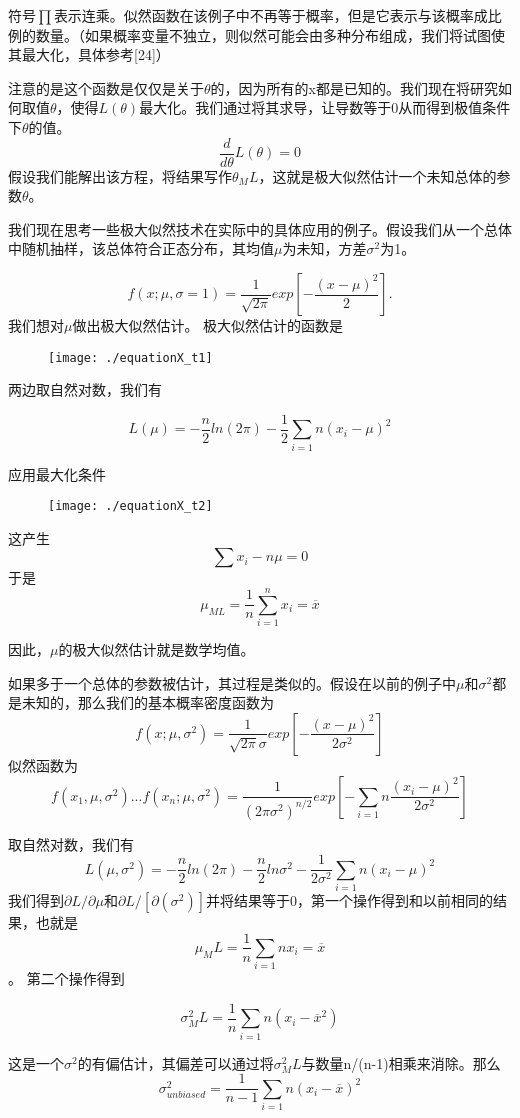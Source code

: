 \documentclass[cn,11pt,chinese]{elegantbook}
\begin{document}
{符号$\prod$表示连乘。似然函数在该例子中不再等于概率，但是它表示与该概率成比例的数量。（如果概率变量不独立，则似然可能会由多种分布组成，我们将试图使其最大化，具体参考[24]）

注意的是这个函数是仅仅是关于$\theta$的，因为所有的x都是已知的。我们现在将研究如何取值$\theta$，使得$L(\theta)$最大化。我们通过将其求导，让导数等于0从而得到极值条件下$\theta$的值。
$$\frac{d}{d\theta}L(\theta) =0$$
假设我们能解出该方程，将结果写作$\theta_ML$，这就是极大似然估计一个未知总体的参数$\theta$。

我们现在思考一些极大似然技术在实际中的具体应用的例子。假设我们从一个总体中随机抽样，该总体符合正态分布，其均值$\mu$为未知，方差$\sigma^2$为1。

$$f(x;\mu,\sigma=1)=\frac{1}{\sqrt{2\pi}}exp[-\frac{(x-\mu)^2}{2}].$$
我们想对$\mu$做出极大似然估计。
极大似然估计的函数是

\begin{figure}
	\texttt{[image: ./equationX\_t1]}
\end{figure}

两边取自然对数，我们有

$$L(\mu)=-\frac{n}{2}ln(2\pi)-\frac{1}{2}\sum_{i=1}{n}(x_i-\mu)^2$$

应用最大化条件

\begin{figure}
	\texttt{[image: ./equationX\_t2]}
\end{figure}


这产生
$$\sum x_i - n\mu   =0$$
于是
$$\mu_{ML}=\frac{1}{n}\sum_{i=1}^n x_i=\overline{x}$$

因此，$\mu$的极大似然估计就是数学均值。

如果多于一个总体的参数被估计，其过程是类似的。假设在以前的例子中$\mu$和$\sigma^2$都是未知的，那么我们的基本概率密度函数为
$$f(x;\mu,\sigma^2)=\frac{1}{\sqrt{2\pi}\sigma}exp[-\frac{(x-\mu)^2}{2\sigma^2}]$$
似然函数为
$$f(x_1,\mu,\sigma^2)...f(x_n;\mu,\sigma^2)=\frac{1}{(2\pi\sigma^2)^{n/2}}exp[-\sum_{i=1}{n}\frac{(x_i-\mu)^2}{2\sigma^2}]$$

取自然对数，我们有
$$L(\mu,\sigma^2)=-\frac{n}{2}ln(2\pi)-\frac{n}{2}ln\sigma^2-\frac{1}{2\sigma^2}\sum_{i=1}{n}(x_i-\mu)^2$$
我们得到$\partial L/\partial \mu$和$\partial L/ [\partial(\sigma^2)]$并将结果等于0，第一个操作得到和以前相同的结果，也就是
$$\mu_ML=\frac{1}{n}\sum_{i=1}{n}x_i=\overline{x}$$。
第二个操作得到

$$\sigma^2_ML=\frac{1}{n}\sum_{i=1}{n}(x_i-\overline{x}^2)$$

这是一个$\sigma^2$的有偏估计，其偏差可以通过将$\sigma^2_ML$与数量n/(n-1)相乘来消除。那么
$$\sigma^2_{unbiased}=\frac{1}{n-1}\sum_{i=1}{n}(x_i-\overline{x})^2$$

}
\end{document}
